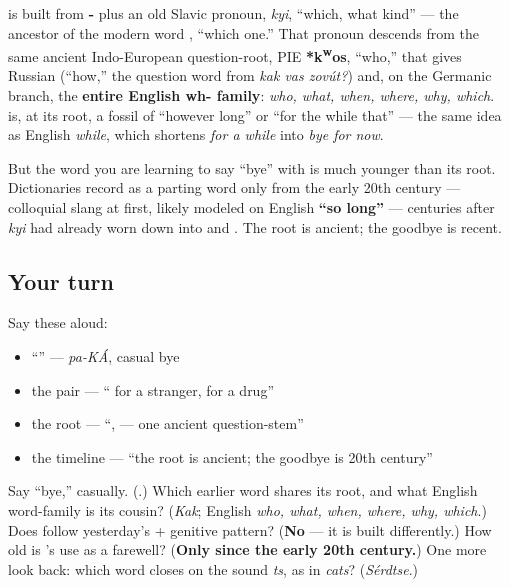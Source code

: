 \begin{cousinweb}
\textbf{} is built from \textbf{-} plus an old Slavic pronoun, \emph{kyi}, \textquotedblleft{}which, what kind\textquotedblright{} — the ancestor of the modern word \textbf{}, \textquotedblleft{}which one.\textquotedblright{} That pronoun descends from the same ancient Indo-European question-root, PIE \textbf{*k\textsuperscript{w}os}, \textquotedblleft{}who,\textquotedblright{} that gives Russian \textbf{} (\textquotedblleft{}how,\textquotedblright{} the question word from \emph{kak vas zovút?}) and, on the Germanic branch, the \textbf{entire English wh- family}: \emph{who, what, when, where, why, which}. \textbf{} is, at its root, a fossil of \textquotedblleft{}however long\textquotedblright{} or \textquotedblleft{}for the while that\textquotedblright{} — the same idea as English \emph{while}, which shortens \emph{for a while} into \emph{bye for now}.

But the word you are learning to say \textquotedblleft{}bye\textquotedblright{} with is much younger than its root. Dictionaries record \emph{} as a parting word only from the early 20th century — colloquial slang at first, likely modeled on English \textbf{\textquotedblleft{}so long\textquotedblright{}} — centuries after \emph{kyi} had already worn down into \emph{} and \emph{}. The root is ancient; the goodbye is recent.
\end{cousinweb}

\subsection*{Your turn}
Say these aloud:

\begin{itemize}
\raggedright
  \item \textquotedblleft{}\textquotedblright{} — \emph{pa-KÁ}, casual bye
  \item the pair — \textquotedblleft{}  for a stranger,  for a drug\textquotedblright{}
  \item the root — \textquotedblleft{},  — one ancient question-stem\textquotedblright{}
  \item the timeline — \textquotedblleft{}the root is ancient; the goodbye is 20th century\textquotedblright{}
\end{itemize}

\begin{tcolorbox}[breakable,colback=teal!4,colframe=teal!35!black,title={Before you move on}]
Say \textquotedblleft{}bye,\textquotedblright{} casually. (\textbf{}.) Which earlier word shares its root, and what English word-family is its cousin? (\emph{Kak}; English \emph{who, what, when, where, why, which}.) Does \emph{} follow yesterday's \emph{} + genitive pattern? (\textbf{No} — it is built differently.) How old is \emph{}'s use as a farewell? (\textbf{Only since the early 20th century.}) One more look back: which word closes on the sound \emph{ts}, as in \emph{cats}? (\emph{Sérdtse}.)
\end{tcolorbox}
